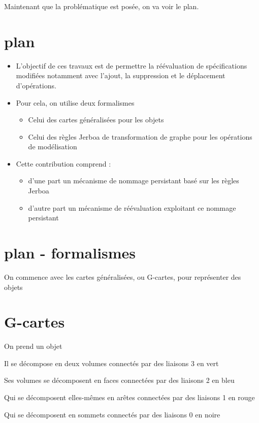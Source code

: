 \documentclass[11pt]{article}
\begin{document}
Maintenant que la problématique est posée, on va voir le plan.

\section{plan}
\label{sec:orgdf64a4e}
\begin{itemize}
	\item L'objectif de ces travaux est de permettre la réévaluation de spécifications
	      modifiées notamment avec l'ajout, la suppression et le déplacement
	      d'opérations.
	\item Pour cela, on utilise deux formalismes
	      \begin{itemize}
		      \item Celui des cartes généralisées pour les objets
		      \item Celui des règles Jerboa de transformation de graphe pour les opérations de
		            modélisation
	      \end{itemize}
	\item Cette contribution comprend :
	      \begin{itemize}
		      \item d'une part un mécanisme de nommage persistant basé sur les règles Jerboa
		      \item d'autre part un mécanisme de réévaluation exploitant ce nommage persistant
	      \end{itemize}
\end{itemize}
\section{plan - formalismes}
\label{sec:orgfbb8259}

On commence avec les cartes généralisées, ou G-cartes, pour représenter des
objets
\section{G-cartes}
\label{sec:orgf33c57b}
On prend un objet

Il se décompose en deux volumes connectés par des liaisons 3 en vert

Ses volumes se décomposent en faces connectées par des liaisons 2 en bleu

Qui se décomposent elles-mêmes en arêtes connectées par des liaisons 1 en rouge

Qui se décomposent en sommets connectés par des liaisons 0 en noire
\end{document}
